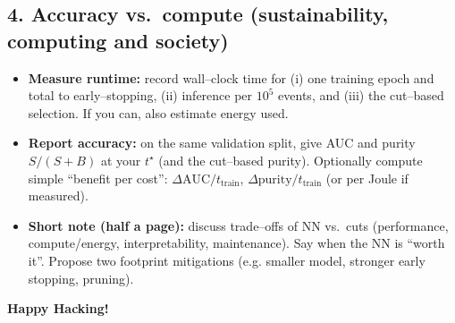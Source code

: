 \documentclass[11pt]{article}
\begin{document}
\subsection*{4. Accuracy vs.\ compute (sustainability, computing and society)}
\begin{itemize}[leftmargin=1.2em]
  \item \textbf{Measure runtime:} record wall–clock time for (i) one training epoch and total to early–stopping, (ii) inference per $10^5$ events, and (iii) the cut–based selection. If you can, also estimate energy used.
  \item \textbf{Report accuracy:} on the same validation split, give AUC and purity $S/(S{+}B)$ at your $t^\star$ (and the cut–based purity). Optionally compute simple ``benefit per cost'': $\Delta\mathrm{AUC}/t_{\text{train}}$, $\Delta\text{purity}/t_{\text{train}}$ (or per Joule if measured).
  \item \textbf{Short note (half a page):} discuss trade–offs of NN vs.\ cuts (performance, compute/energy, interpretability, maintenance). Say when the NN is ``worth it''. Propose two footprint mitigations (e.g. smaller model, stronger early stopping, pruning).
\end{itemize}


\begin{center}
\textbf{Happy Hacking!}
\end{center}
\end{document}
